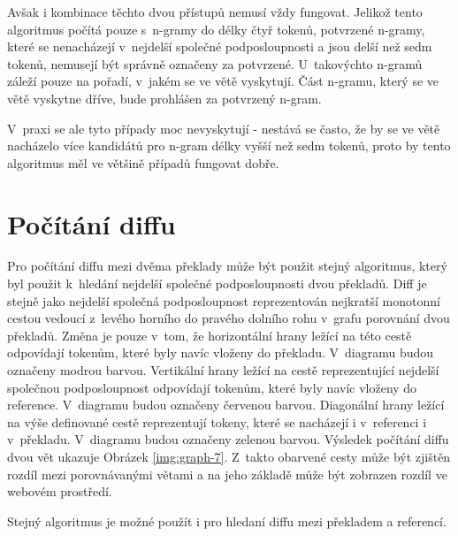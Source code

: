 Avšak i kombinace těchto dvou přístupů nemusí vždy fungovat.
Jelikož tento algoritmus počítá pouze s~\mbox{n-gramy} do délky čtyř tokenů,
  potvrzené \mbox{n-gramy},
  které se nenacházejí v~nejdelší společné podposloupnosti a jsou delší než sedm tokenů,
  nemusejí být správně označeny za potvrzené.
U~takovýchto \mbox{n-gramů} záleží pouze na pořadí, v~jakém se ve větě vyskytují.
Část \mbox{n-gramu},
  který se ve větě vyskytne dříve,
  bude prohlášen za potvrzený \mbox{n-gram}.

V~praxi se ale tyto případy moc nevyskytují -
  nestává se často, že by se ve větě nacházelo více kandidátů pro \mbox{n-gram} délky vyšší než sedm tokenů,
  proto by tento algoritmus měl ve většině případů fungovat dobře.


\section{Počítání diffu}
Pro počítání diffu mezi dvěma překlady může být použit stejný algoritmus,
  který byl použit k~hledání nejdelší společné podposloupnosti dvou překladů.
Diff je stejně jako nejdelší společná podposloupnost reprezentován nejkratší monotonní cestou vedoucí z~levého horního do pravého dolního rohu v~grafu porovnání dvou překladů.
Změna je pouze v~tom, že horizontální hrany ležící na této cestě odpovídají tokenům,
  které byly navíc vloženy do překladu.
V~diagramu budou označeny modrou barvou.
Vertikální hrany ležící na cestě reprezentující nejdelší společnou podposloupnost odpovídají tokenům,
  které byly navíc vloženy do reference.
V~diagramu budou označeny červenou barvou.
Diagonální hrany ležící na výše definované cestě reprezentují tokeny,
  které se nacházejí i v~referenci i v~překladu.
V~diagramu budou označeny zelenou barvou.
Výsledek počítání diffu dvou vět ukazuje Obrázek \ref{img:graph-7}.
Z~takto obarvené cesty může být zjištěn rozdíl mezi porovnávanými větami
  a na jeho základě může být zobrazen rozdíl ve webovém prostředí.

Stejný algoritmus je možné použít i pro hledaní diffu mezi překladem a referencí.

